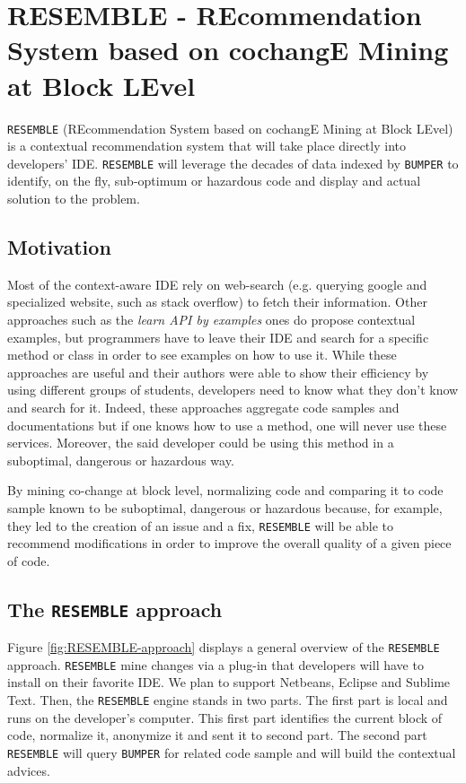 
\section{RESEMBLE - REcommendation System based on cochangE Mining at Block LEvel\label{sec:RESEMBLE}}

{\tt RESEMBLE} (REcommendation System based on cochangE Mining at Block LEvel) is a contextual recommendation system that will take place directly into developers' IDE. {\tt RESEMBLE} will leverage the decades of data indexed by {\tt BUMPER} to identify, on the fly, sub-optimum or hazardous code and display and actual solution to the problem.

\subsection{Motivation}

Most of the context-aware IDE \cite{Brandt2009,JoelBrandt} rely on web-search (e.g. querying google and specialized website, such as stack overflow) to fetch their information.
Other approaches such as the {\it learn API by examples} ones \cite{Kim2011,Montandon2013} do propose contextual examples, but programmers have to leave their IDE and search for a specific method or class in order to see examples on how to use it.
While these approaches are useful and their authors were able to show their efficiency by using different groups of students, developers need to know what they don't know and search for it.
Indeed, these approaches aggregate code samples and documentations but if one knows how to use a method, one will never use these services.
Moreover, the said developer could be using this method in a suboptimal, dangerous or hazardous way.

By mining co-change at block level, normalizing code and comparing it to code sample known to be suboptimal, dangerous or hazardous because, for example,  they led to the creation of an issue and a fix, {\tt RESEMBLE} will be able to recommend modifications in order to improve the overall quality of a given piece of code.

\subsection{The {\tt RESEMBLE} approach}

Figure \ref{fig:RESEMBLE-approach} displays a general overview of the {\tt RESEMBLE} approach. {\tt RESEMBLE} mine changes via a plug-in that developers will have to install on their favorite IDE.
We plan to support Netbeans, Eclipse and Sublime Text.
Then, the {\tt RESEMBLE} engine stands in two parts. The first part is local and runs on the developer's computer.
This first part identifies the current block of code, normalize it, anonymize it and sent it to second part.
The second part {\tt RESEMBLE} will query {\tt BUMPER} for related code sample and will build the contextual advices.

